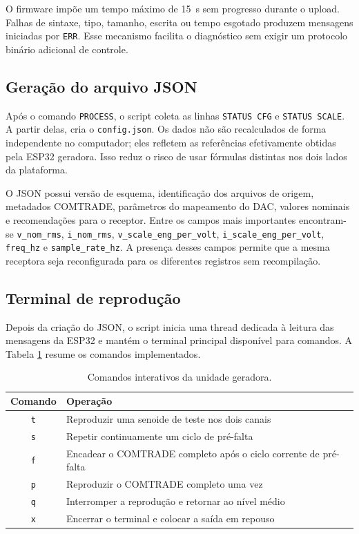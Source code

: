 O firmware impõe um tempo máximo de \SI{15}{\second} sem progresso durante o upload. Falhas de sintaxe, tipo, tamanho, escrita ou tempo esgotado produzem mensagens iniciadas por \texttt{ERR}. Esse mecanismo facilita o diagnóstico sem exigir um protocolo binário adicional de controle.

\subsection{Geração do arquivo JSON}

Após o comando \texttt{PROCESS}, o script coleta as linhas \texttt{STATUS CFG} e \texttt{STATUS SCALE}. A partir delas, cria o \texttt{config.json}. Os dados não são recalculados de forma independente no computador; eles refletem as referências efetivamente obtidas pela ESP32 geradora. Isso reduz o risco de usar fórmulas distintas nos dois lados da plataforma.

O JSON possui versão de esquema, identificação dos arquivos de origem, metadados COMTRADE, parâmetros do mapeamento do DAC, valores nominais e recomendações para o receptor. Entre os campos mais importantes encontram-se \texttt{v\_nom\_rms}, \texttt{i\_nom\_rms}, \texttt{v\_scale\_eng\_per\_volt}, \texttt{i\_scale\_eng\_per\_volt}, \texttt{freq\_hz} e \texttt{sample\_rate\_hz}. A presença desses campos permite que a mesma receptora seja reconfigurada para os diferentes registros sem recompilação.

\subsection{Terminal de reprodução}

Depois da criação do JSON, o script inicia uma thread dedicada à leitura das mensagens da ESP32 e mantém o terminal principal disponível para comandos. A Tabela \ref{tab:comandos-gerador} resume os comandos implementados.

\begin{table}[H]
  \centering
  \small
  \caption{Comandos interativos da unidade geradora.}
  \label{tab:comandos-gerador}
  \begin{tabular}{cl}
    \toprule
    Comando & Operação \\
    \midrule
    \texttt{t} & Reproduzir uma senoide de teste nos dois canais \\
    \texttt{s} & Repetir continuamente um ciclo de pré-falta \\
    \texttt{f} & Encadear o COMTRADE completo após o ciclo corrente de pré-falta \\
    \texttt{p} & Reproduzir o COMTRADE completo uma vez \\
    \texttt{q} & Interromper a reprodução e retornar ao nível médio \\
    \texttt{x} & Encerrar o terminal e colocar a saída em repouso \\
    \bottomrule
  \end{tabular}
\end{table}

